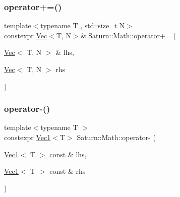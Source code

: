 \mbox{\label{namespace_saturn_1_1_math_a488f67c55f544298aa09600880e6f163}} 
\subsubsection{\texorpdfstring{operator+=()}{operator+=()}}
{\footnotesize\ttfamily template$<$typename T , std\+::size\+\_\+t N$>$ \\
constexpr \mbox{\hyperlink{class_saturn_1_1_math_1_1_vec}{Vec}}$<$T, N$>$\& Saturn\+::\+Math\+::operator+= (\begin{DoxyParamCaption}\item[{\mbox{\hyperlink{class_saturn_1_1_math_1_1_vec}{Vec}}$<$ T, N $>$ \&}]{lhs,  }\item[{\mbox{\hyperlink{class_saturn_1_1_math_1_1_vec}{Vec}}$<$ T, N $>$}]{rhs }\end{DoxyParamCaption})}

\mbox{\label{namespace_saturn_1_1_math_aee745503d5ed41b38b7c64d6ead34c2e}} 
\subsubsection{\texorpdfstring{operator-\/()}{operator-()}\hspace{0.1cm}{\footnotesize\ttfamily [1/4]}}
{\footnotesize\ttfamily template$<$typename T $>$ \\
constexpr \mbox{\hyperlink{namespace_saturn_1_1_math_acae4f808f0c3284d0b60ee1ac720deaa}{Vec1}}$<$T$>$ Saturn\+::\+Math\+::operator-\/ (\begin{DoxyParamCaption}\item[{\mbox{\hyperlink{namespace_saturn_1_1_math_acae4f808f0c3284d0b60ee1ac720deaa}{Vec1}}$<$ T $>$ const \&}]{lhs,  }\item[{\mbox{\hyperlink{namespace_saturn_1_1_math_acae4f808f0c3284d0b60ee1ac720deaa}{Vec1}}$<$ T $>$ const \&}]{rhs }\end{DoxyParamCaption})}

\mbox{\label{namespace_saturn_1_1_math_a72c8b985e10b066ba66aa5ec704395e8}} 
